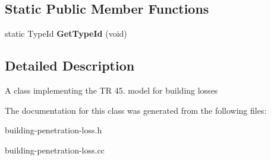 \subsection*{Static Public Member Functions}
\begin{DoxyCompactItemize}
\item 
\mbox{\label{classns3_1_1lorawan_1_1BuildingPenetrationLoss_ad3ffa20fecb2e17a367f95b965c8c6a3}} 
static Type\+Id {\bfseries Get\+Type\+Id} (void)
\end{DoxyCompactItemize}


\subsection{Detailed Description}
A class implementing the TR 45. model for building losses 

The documentation for this class was generated from the following files\+:\begin{DoxyCompactItemize}
\item 
building-\/penetration-\/loss.\+h\item 
building-\/penetration-\/loss.\+cc\end{DoxyCompactItemize}
